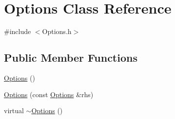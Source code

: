 \hypertarget{class_options}{
\section{\-Options \-Class \-Reference}
\label{class_options}
}


{\ttfamily \#include $<$\-Options.\-h$>$}

\subsection*{\-Public \-Member \-Functions}
\begin{DoxyCompactItemize}
\item 
\hyperlink{class_options_ab72fb640172a6109e34c8a5366563753}{\-Options} ()
\item 
\hyperlink{class_options_ad9215a27608868991e0cd3e9081cb3b4}{\-Options} (const \hyperlink{class_options}{\-Options} \&rhs)
\item 
virtual \hyperlink{class_options_a86ddb85b183f8b58af5481f30a42fa92}{$\sim$\-Options} ()
\end{DoxyCompactItemize}
